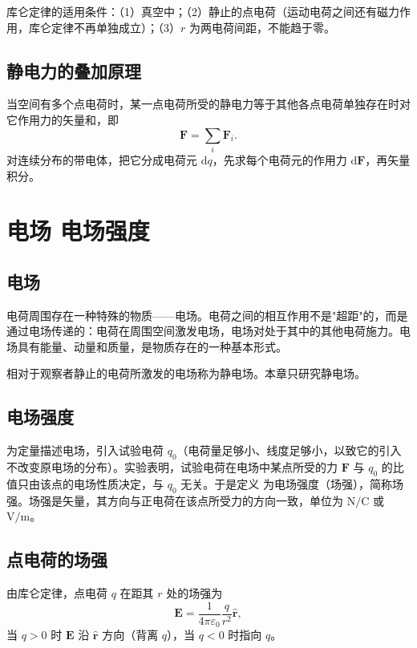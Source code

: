     库仑定律的适用条件：（1）真空中；（2）静止的点电荷（运动电荷之间还有磁力作用，库仑定律不再单独成立）；（3）$r$ 为两电荷间距，不能趋于零。

    \subsection{静电力的叠加原理}
    当空间有多个点电荷时，某一点电荷所受的静电力等于其他各点电荷单独存在时对它作用力的矢量和，即
    \[
    \boldsymbol{F}=\sum_i\boldsymbol{F}_i.
    \]
    对连续分布的带电体，把它分成电荷元 $\mathrm{d}q$，先求每个电荷元的作用力 $\mathrm{d}\boldsymbol{F}$，再矢量积分。


\section{电场 电场强度}
    \subsection{电场}
    电荷周围存在一种特殊的物质——电场。电荷之间的相互作用不是"超距"的，而是通过电场传递的：电荷在周围空间激发电场，电场对处于其中的其他电荷施力。电场具有能量、动量和质量，是物质存在的一种基本形式。

    相对于观察者静止的电荷所激发的电场称为静电场。本章只研究静电场。

    \subsection{电场强度}
    为定量描述电场，引入试验电荷 $q_0$（电荷量足够小、线度足够小，以致它的引入不改变原电场的分布）。实验表明，试验电荷在电场中某点所受的力 $\boldsymbol{F}$ 与 $q_0$ 的比值只由该点的电场性质决定，与 $q_0$ 无关。于是定义
    为电场强度（场强），简称场强。场强是矢量，其方向与正电荷在该点所受力的方向一致，单位为 $\mathrm{N/C}$ 或 $\mathrm{V/m}$。

    \subsection{点电荷的场强}
    由库仑定律，点电荷 $q$ 在距其 $r$ 处的场强为
    \[
    \boldsymbol{E}=\frac{1}{4\pi\varepsilon_0}\frac{q}{r^{2}}\hat{\boldsymbol{r}},
    \]
    当 $q>0$ 时 $\boldsymbol{E}$ 沿 $\hat{\boldsymbol{r}}$ 方向（背离 $q$），当 $q<0$ 时指向 $q$。

